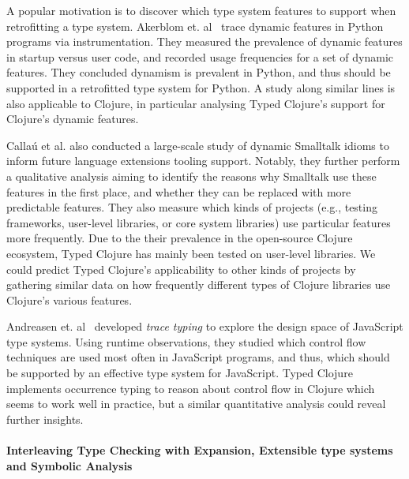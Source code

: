 \documentclass[9pt]{extarticle}
\begin{document}
A popular motivation is to discover which type system features to support
when retrofitting a type system.
Akerblom et. al~\cite{Akerblom:2014:TDF:2597073.2597103} trace dynamic features in Python programs
via instrumentation. They measured the prevalence of dynamic features in startup versus
user code, and recorded usage frequencies for a set of dynamic features.
They concluded dynamism is prevalent in Python, and thus should be supported
in a retrofitted type system for Python.
A study along similar lines is also applicable to Clojure, in particular analysing Typed
Clojure's support for Clojure's dynamic features.

Calla{\'u} et al. \cite{Callau2013} also conducted a large-scale study of
dynamic Smalltalk idioms to inform future language extensions tooling support.
Notably, they further perform a qualitative analysis aiming to identify
the reasons why Smalltalk use these features in the first place, and
whether they can be replaced with more predictable features. They also 
measure which kinds of projects (e.g., testing frameworks, user-level libraries, or core system libraries) 
use particular features more frequently.
Due to the their prevalence in the open-source Clojure ecosystem,
Typed Clojure has mainly been tested on user-level libraries.
We could predict Typed Clojure's applicability to other kinds of projects
by gathering similar data on how frequently different types of Clojure libraries use
Clojure's various features.

Andreasen et. al~\cite{Andreasen2016TraceTA} developed
\emph{trace typing} to explore the design space of JavaScript type systems. 
Using runtime observations, they studied which control flow techniques
are used most often in JavaScript programs, and thus, which should
be supported by an effective type system for JavaScript.
Typed Clojure implements occurrence typing to reason about control
flow in Clojure which seems to work well in practice, but a similar
quantitative analysis could reveal further insights.



\paragraph{Interleaving Type Checking with Expansion, Extensible type systems and Symbolic Analysis}
\end{document}
